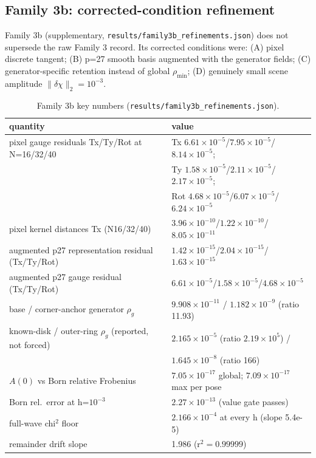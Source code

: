 \documentclass[12pt]{article}
\begin{document}
\subsection{Family 3b: corrected-condition refinement}\label{sec:family3b}

Family 3b (supplementary, \texttt{results/family3b\_refinements.json}) does not
supersede the raw Family 3 record. Its corrected conditions were: (A) pixel
discrete tangent; (B) p=27 smooth basis augmented with the generator fields;
(C) generator-specific retention instead of global $\rho_{\min}$; (D)
genuinely small scene amplitude $\|\delta\chi\|_2=10^{-3}$.

\begin{table}[ht]
\centering
\small
\caption{Family 3b key numbers (\texttt{results/family3b\_refinements.json}).}
\label{tab:f3b}
\begin{tabular}{p{} p{}}
\toprule
quantity & value \\
\midrule
pixel gauge residuals Tx/Ty/Rot at N=16/32/40 &
Tx $6.61\times10^{-5}$/$7.95\times10^{-5}$/$8.14\times10^{-5}$; \\
 & Ty $1.58\times10^{-5}$/$2.11\times10^{-5}$/$2.17\times10^{-5}$; \\
 & Rot $4.68\times10^{-5}$/$6.07\times10^{-5}$/$6.24\times10^{-5}$ \\
pixel kernel distances Tx (N16/32/40) &
$3.96\times10^{-10}$/$1.22\times10^{-10}$/$8.05\times10^{-11}$ \\
augmented p27 representation residual (Tx/Ty/Rot) &
$1.42\times10^{-15}$/$2.04\times10^{-15}$/$1.63\times10^{-15}$ \\
augmented p27 gauge residual (Tx/Ty/Rot) &
$6.61\times10^{-5}$/$1.58\times10^{-5}$/$4.68\times10^{-5}$ \\
base / corner-anchor generator $\rho_g$ &
$9.908\times10^{-11}$ / $1.182\times10^{-9}$ (ratio 11.93) \\
known-disk / outer-ring $\rho_g$ (reported, not forced) &
$2.165\times10^{-5}$ (ratio $2.19\times10^5$) / \\
 & $1.645\times10^{-8}$ (ratio 166) \\
$A(0)$ vs Born relative Frobenius &
$7.05\times10^{-17}$ global; $7.09\times10^{-17}$ max per pose \\
Born rel.\ error at h=$10^{-3}$ &
$2.27\times10^{-13}$ (value gate passes) \\
full-wave chi$^2$ floor & $2.166\times10^{-4}$ at every h (slope 5.4e-5) \\
remainder drift slope & 1.986 (r$^2=0.99999$) \\
\bottomrule
\end{tabular}
\end{table}
\end{document}

